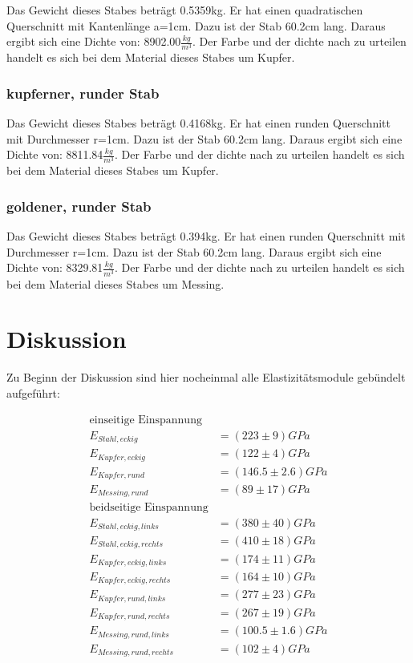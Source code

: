 Das Gewicht dieses Stabes beträgt 0.5359kg. Er hat einen quadratischen Querschnitt mit Kantenlänge a=1cm. Dazu ist der Stab 60.2cm lang. Daraus ergibt sich eine Dichte von: 8902.00$\frac{kg}{m^3}$.
Der Farbe und der dichte nach zu urteilen handelt es sich bei dem Material dieses Stabes um Kupfer.

\subsubsection{kupferner, runder Stab}

Das Gewicht dieses Stabes beträgt 0.4168kg. Er hat einen runden Querschnitt mit Durchmesser r=1cm. Dazu ist der Stab 60.2cm lang. Daraus ergibt sich eine Dichte von: 8811.84$\frac{kg}{m^3}$.
Der Farbe und der dichte nach zu urteilen handelt es sich bei dem Material dieses Stabes um Kupfer.

\subsubsection{goldener, runder Stab}

Das Gewicht dieses Stabes beträgt 0.394kg. Er hat einen runden Querschnitt mit Durchmesser r=1cm. Dazu ist der Stab 60.2cm lang. Daraus ergibt sich eine Dichte von: 8329.81$\frac{kg}{m^3}$.
Der Farbe und der dichte nach zu urteilen handelt es sich bei dem Material dieses Stabes um Messing.

\section{Diskussion}

Zu Beginn der Diskussion sind hier nocheinmal alle Elastizitätsmodule gebündelt aufgeführt:

\begin{align*}
    \text{einseitige Einspannung}\\
    E_{Stahl, eckig} &= (223\pm 9) GPa \\
    E_{Kupfer, eckig} &= (122\pm 4) GPa \\
    E_{Kupfer, rund} &= (146.5\pm 2.6) GPa \\
    E_{Messing, rund} &= (89\pm 17) GPa \\
    \text{beidseitige Einspannung} \\
    E_{Stahl, eckig, links} &= (380\pm 40)GPa\\
    E_{Stahl, eckig, rechts} &= (410\pm 18)GPa\\
    E_{Kupfer, eckig, links} &= (174\pm 11)GPa\\
    E_{Kupfer, eckig, rechts} &= (164\pm 10)GPa\\
    E_{Kupfer, rund, links} &= (277\pm 23)GPa\\
    E_{Kupfer, rund, rechts} &= (267\pm 19)GPa\\
    E_{Messing, rund, links} &= (100.5\pm 1.6)GPa\\
    E_{Messing, rund, rechts} &= (102\pm 4)GPa\\
\end{align*}

